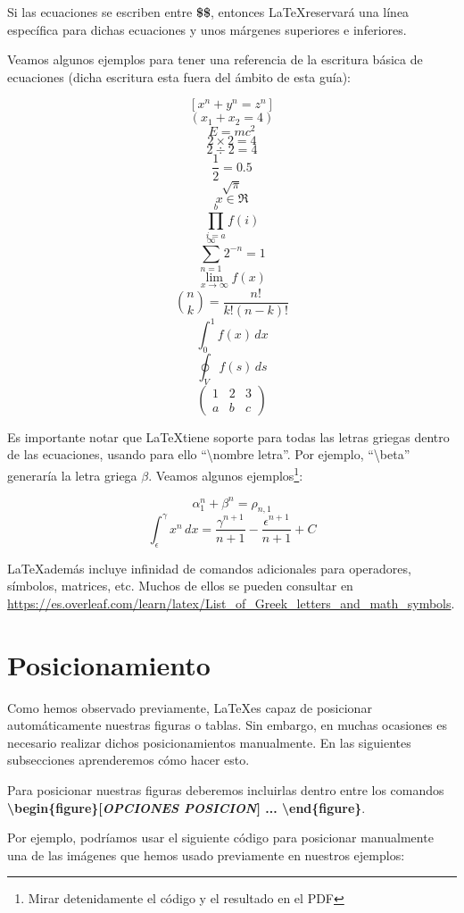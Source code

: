 Si las ecuaciones se escriben entre \textbf{\$\$}, entonces \LaTeX reservará una línea específica para dichas ecuaciones y unos márgenes superiores e inferiores.

Veamos algunos ejemplos para tener una referencia de la escritura básica de ecuaciones (dicha escritura esta fuera del ámbito de esta guía):

$$[ x^n + y^n = z^n ]$$
$$( x_1+x_2=4 )$$
$$E=mc^2$$
$$2\times 2 = 4$$
$$2\div 2 = 4$$
$$\frac{1}{2} = 0.5$$
$$\sqrt{\pi}$$
$$x \in \Re$$
$$\prod_{i=a}^{b} f(i) $$
$$\sum_{n=1}^{\infty} 2^{-n} = 1 $$
$$\lim_{x\to\infty} f(x)$$
$$\binom{n}{k} = \frac{n!}{k!(n-k)!}$$
$$\int_0^1 f(x) \,dx$$
$$\oint_V f(s) \,ds$$
$$\begin{pmatrix}
1 & 2 & 3\\
a & b & c
\end{pmatrix}$$

Es importante notar que \LaTeX tiene soporte para todas las letras griegas dentro de las ecuaciones, usando para ello ``\textbackslash nombre letra''. Por ejemplo, ``\textbackslash beta'' generaría la letra griega $\beta$. Veamos algunos ejemplos\footnote{Mirar detenidamente el código y el resultado en el PDF}:

$$\alpha^n_1 + \beta^n = \rho_{n,1}$$
$$\int_\epsilon^\gamma x^n \,dx = \frac{\gamma^{n+1}}{n+1} - \frac{\epsilon^{n+1}}{n+1} + C$$

\LaTeX además incluye infinidad de comandos adicionales para operadores, símbolos, matrices, etc. Muchos de ellos se pueden consultar en \url{https://es.overleaf.com/learn/latex/List_of_Greek_letters_and_math_symbols}.

\section{Posicionamiento}

Como hemos observado previamente, \LaTeX es capaz de posicionar automáticamente nuestras figuras o tablas. Sin embargo, en muchas ocasiones es necesario realizar dichos posicionamientos manualmente. En las siguientes subsecciones aprenderemos cómo hacer esto.

Para posicionar nuestras figuras deberemos incluirlas dentro entre los comandos \textbf{\textbackslash begin\{figure\}[\emph{OPCIONES POSICION}] ... \textbackslash end\{figure\}}.

Por ejemplo, podríamos usar el siguiente código para posicionar manualmente una de las imágenes que hemos usado previamente en nuestros ejemplos:

